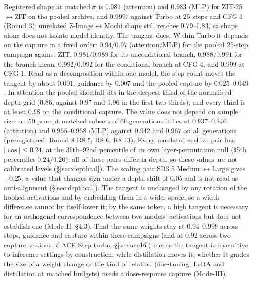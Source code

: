 \documentclass[11pt]{article}
\newcommand{\TT}{ZIT-25}%
\begin{document}
Registered shape at matched $\sigma$ is $0.981$ (attention) and $0.983$ (MLP) for \TT{}$\leftrightarrow$ZIT on the pooled archive, and $0.9997$ against Turbo at 25 steps and CFG 1 (Round 3); unrelated Z-Image$\leftrightarrow$Mochi shape still reaches $0.79$--$0.83$, so shape alone does not isolate model identity. The tangent does. Within Turbo it depends on the capture in a fixed order: $0.94$/$0.97$ (attention/MLP) for the pooled 25-step campaign against ZIT, $0.981$/$0.989$ for its unconditional branch, $0.988$/$0.991$ for the branch mean, $0.992$/$0.992$ for the conditional branch at CFG 4, and $0.999$ at CFG 1. Read as a decomposition within one model, the step count moves the tangent by about $0.001$, guidance by $0.007$ and the pooled capture by $0.025$--$0.049$. In attention the pooled shortfall sits in the deepest third of the normalised depth grid ($0.86$, against $0.97$ and $0.96$ in the first two thirds), and every third is at least $0.98$ on the conditional capture. The value does not depend on sample size: on 50 prompt-matched subsets of 60 generations it lies at $0.937$--$0.946$ (attention) and $0.965$--$0.968$ (MLP) against $0.942$ and $0.967$ on all generations (preregistered, Round 8 R8-5, R8-6, R8-13). Every unrelated archive pair has $|\cos|\le0.24$, at the 39th--92nd percentile of its own layer-permutation null (95th percentiles $0.24$/$0.20$); all of these pairs differ in depth, so these values are not calibrated levels (\S\ref{sec:depthcal}). The scaling pair SD3.5 Medium$\leftrightarrow$Large gives $-0.25$, a value that changes sign under a depth shift of $0.05$ and is not read as anti-alignment (\S\ref{sec:depthcal}). The tangent is unchanged by any rotation of the hooked activations and by embedding them in a wider space, so a width difference cannot by itself lower it; by the same token, a high tangent is necessary for an orthogonal correspondence between two models' activations but does not establish one (Mode-II, \S4.3). That the same weights stay at $0.94$--$0.999$ across steps, guidance and capture within these campaigns (and at $0.92$ across two capture sessions of ACE-Step turbo, \S\ref{sec:ace16}) means the tangent is insensitive to inference settings by construction, while distillation moves it; whether it grades the size of a weight change or the kind of relation (fine-tuning, LoRA and distillation at matched budgets) needs a dose-response capture (Mode-III).
\end{document}
